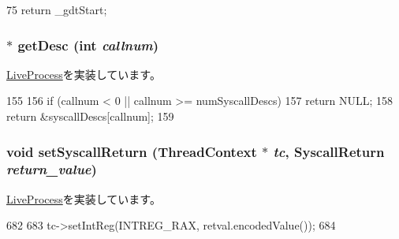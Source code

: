 \begin{DoxyCode}
75         { return _gdtStart; }
\end{DoxyCode}
\hypertarget{classX86ISA_1_1X86LiveProcess_aebbff609a7235342925445690acf5ee8}{
\subsubsection[{getDesc}]{ $\ast$ getDesc (int {\em callnum})}}
\label{classX86ISA_1_1X86LiveProcess_aebbff609a7235342925445690acf5ee8}


\hyperlink{classLiveProcess_a478f396f8895ef7728d26866a00121d7}{LiveProcess}を実装しています。


\begin{DoxyCode}
155 {
156     if (callnum < 0 || callnum >= numSyscallDescs)
157         return NULL;
158     return &syscallDescs[callnum];
159 }
\end{DoxyCode}
\hypertarget{classX86ISA_1_1X86LiveProcess_aaefd02663c1eae206b851290d9276a5e}{
\subsubsection[{setSyscallReturn}]{\setlength{\rightskip}{0pt plus 5cm}void setSyscallReturn ({\bf ThreadContext} $\ast$ {\em tc}, \/  {\bf SyscallReturn} {\em return\_\-value})}}
\label{classX86ISA_1_1X86LiveProcess_aaefd02663c1eae206b851290d9276a5e}


\hyperlink{classLiveProcess_a5955e790542b86589b9fd75df24ec2d3}{LiveProcess}を実装しています。


\begin{DoxyCode}
682 {
683     tc->setIntReg(INTREG_RAX, retval.encodedValue());
684 }
\end{DoxyCode}



